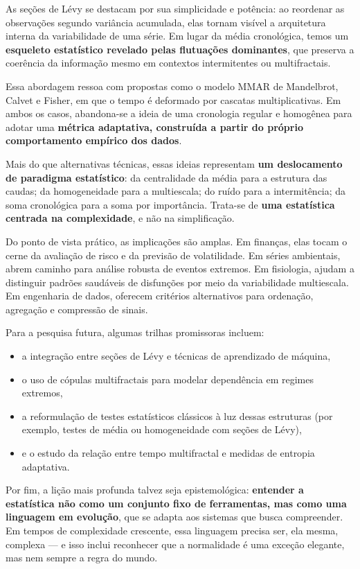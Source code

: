\documentclass[
]{agujournal2019}
\providecommand{\tightlist}{%
  \setlength{\itemsep}{0pt}\setlength{\parskip}{0pt}}\usepackage{longtable,booktabs,array}
\begin{document}
As seções de Lévy se destacam por sua simplicidade e potência: ao
reordenar as observações segundo variância acumulada, elas tornam
visível a arquitetura interna da variabilidade de uma série. Em lugar da
média cronológica, temos um \textbf{esqueleto estatístico revelado pelas
flutuações dominantes}, que preserva a coerência da informação mesmo em
contextos intermitentes ou multifractais.

Essa abordagem ressoa com propostas como o modelo MMAR de Mandelbrot,
Calvet e Fisher, em que o tempo é deformado por cascatas
multiplicativas. Em ambos os casos, abandona-se a ideia de uma
cronologia regular e homogênea para adotar uma \textbf{métrica
adaptativa, construída a partir do próprio comportamento empírico dos
dados}.

Mais do que alternativas técnicas, essas ideias representam \textbf{um
deslocamento de paradigma estatístico}: da centralidade da média para a
estrutura das caudas; da homogeneidade para a multiescala; do ruído para
a intermitência; da soma cronológica para a soma por importância.
Trata-se de \textbf{uma estatística centrada na complexidade}, e não na
simplificação.

Do ponto de vista prático, as implicações são amplas. Em finanças, elas
tocam o cerne da avaliação de risco e da previsão de volatilidade. Em
séries ambientais, abrem caminho para análise robusta de eventos
extremos. Em fisiologia, ajudam a distinguir padrões saudáveis de
disfunções por meio da variabilidade multiescala. Em engenharia de
dados, oferecem critérios alternativos para ordenação, agregação e
compressão de sinais.

Para a pesquisa futura, algumas trilhas promissoras incluem:

\begin{itemize}
\tightlist
\item
  a integração entre seções de Lévy e técnicas de aprendizado de
  máquina,
\item
  o uso de cópulas multifractais para modelar dependência em regimes
  extremos,
\item
  a reformulação de testes estatísticos clássicos à luz dessas
  estruturas (por exemplo, testes de média ou homogeneidade com seções
  de Lévy),
\item
  e o estudo da relação entre tempo multifractal e medidas de entropia
  adaptativa.
\end{itemize}

Por fim, a lição mais profunda talvez seja epistemológica:
\textbf{entender a estatística não como um conjunto fixo de ferramentas,
mas como uma linguagem em evolução}, que se adapta aos sistemas que
busca compreender. Em tempos de complexidade crescente, essa linguagem
precisa ser, ela mesma, complexa --- e isso inclui reconhecer que a
normalidade é uma exceção elegante, mas nem sempre a regra do mundo.
\end{document}
